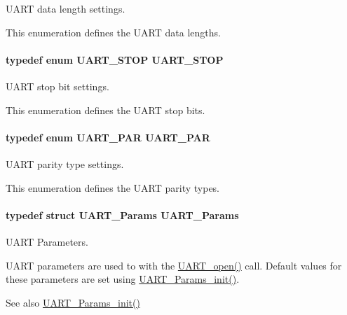 U\+A\+R\+T data length settings. 

This enumeration defines the U\+A\+R\+T data lengths. 
\paragraph[{U\+A\+R\+T\+\_\+\+S\+T\+O\+P}]{\setlength{\rightskip}{0pt plus 5cm}typedef enum {\bf U\+A\+R\+T\+\_\+\+S\+T\+O\+P}  {\bf U\+A\+R\+T\+\_\+\+S\+T\+O\+P}}\label{_u_a_r_t_8h_a7f2ba2e85c63055e158e5e4b51b1f9fd}


U\+A\+R\+T stop bit settings. 

This enumeration defines the U\+A\+R\+T stop bits. 
\paragraph[{U\+A\+R\+T\+\_\+\+P\+A\+R}]{\setlength{\rightskip}{0pt plus 5cm}typedef enum {\bf U\+A\+R\+T\+\_\+\+P\+A\+R}  {\bf U\+A\+R\+T\+\_\+\+P\+A\+R}}\label{_u_a_r_t_8h_a12584e934e85933c6b20b59b0ac5c343}


U\+A\+R\+T parity type settings. 

This enumeration defines the U\+A\+R\+T parity types. 
\paragraph[{U\+A\+R\+T\+\_\+\+Params}]{\setlength{\rightskip}{0pt plus 5cm}typedef struct {\bf U\+A\+R\+T\+\_\+\+Params}  {\bf U\+A\+R\+T\+\_\+\+Params}}\label{_u_a_r_t_8h_a533d172a10c22e1e5b94e9d0a055d882}


U\+A\+R\+T Parameters. 

U\+A\+R\+T parameters are used to with the \hyperlink{_u_a_r_t_8h_a0442ea1ec23901168da31726bb3254c1}{U\+A\+R\+T\+\_\+open()} call. Default values for these parameters are set using \hyperlink{_u_a_r_t_8h_a40e5c0823bb7ffd2e8fbf19f9f20b399}{U\+A\+R\+T\+\_\+\+Params\+\_\+init()}.

\begin{DoxySeeAlso}{See also}
\hyperlink{_u_a_r_t_8h_a40e5c0823bb7ffd2e8fbf19f9f20b399}{U\+A\+R\+T\+\_\+\+Params\+\_\+init()} 
\end{DoxySeeAlso}
